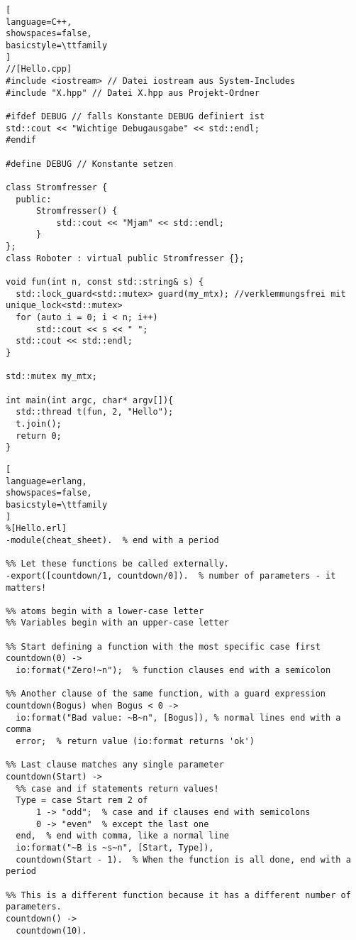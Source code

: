 \documentclass[10pt]{article}
\begin{document}
\begin{lstlisting}[
language=C++,
showspaces=false,
basicstyle=\ttfamily
]
//[Hello.cpp]
#include <iostream> // Datei iostream aus System-Includes
#include "X.hpp" // Datei X.hpp aus Projekt-Ordner

#ifdef DEBUG // falls Konstante DEBUG definiert ist
std::cout << "Wichtige Debugausgabe" << std::endl;
#endif

#define DEBUG // Konstante setzen

class Stromfresser {
  public:
      Stromfresser() {
          std::cout << "Mjam" << std::endl;
      }
};
class Roboter : virtual public Stromfresser {};

void fun(int n, const std::string& s) {
  std::lock_guard<std::mutex> guard(my_mtx); //verklemmungsfrei mit unique_lock<std::mutex>
  for (auto i = 0; i < n; i++)
      std::cout << s << " ";
  std::cout << std::endl;
}

std::mutex my_mtx;

int main(int argc, char* argv[]){
  std::thread t(fun, 2, "Hello");
  t.join();
  return 0;
}
\end{lstlisting}
\hfill

\begin{lstlisting}[
language=erlang,
showspaces=false,
basicstyle=\ttfamily
]
%[Hello.erl]
-module(cheat_sheet).  % end with a period

%% Let these functions be called externally.
-export([countdown/1, countdown/0]).  % number of parameters - it matters!

%% atoms begin with a lower-case letter
%% Variables begin with an upper-case letter

%% Start defining a function with the most specific case first
countdown(0) ->  
  io:format("Zero!~n");  % function clauses end with a semicolon

%% Another clause of the same function, with a guard expression
countdown(Bogus) when Bogus < 0 ->
  io:format("Bad value: ~B~n", [Bogus]), % normal lines end with a comma
  error;  % return value (io:format returns 'ok')
  
%% Last clause matches any single parameter
countdown(Start) ->
  %% case and if statements return values!
  Type = case Start rem 2 of
      1 -> "odd";  % case and if clauses end with semicolons
      0 -> "even"  % except the last one
  end,  % end with comma, like a normal line
  io:format("~B is ~s~n", [Start, Type]), 
  countdown(Start - 1).  % When the function is all done, end with a period

%% This is a different function because it has a different number of parameters.
countdown() ->
  countdown(10).
\end{lstlisting}
\end{document}
